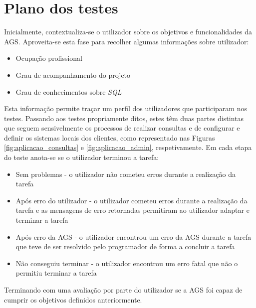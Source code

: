 \documentclass[11pt,twoside,a4paper]{report}
\begin{document}
\section{Plano dos testes}
Inicialmente, contextualiza-se o utilizador sobre os objetivos e funcionalidades da AGS. Aproveita-se esta fase para recolher algumas informações sobre utilizador:
\begin{itemize}
	\item Ocupação profissional
	\item Grau de acompanhamento do projeto
	\item Grau de conhecimentos sobre \textit{SQL}
\end{itemize}
Esta informação permite traçar um perfil dos utilizadores que participaram nos testes. Passando aos testes propriamente ditos, estes têm duas partes distintas que seguem sensivelmente os processos de realizar consultas e de configurar e definir os sistemas locais dos clientes, como representado nas Figuras \ref{fig:aplicacao_consultas} e \ref{fig:aplicacao_admin}, respetivamente.
Em cada etapa do teste anota-se se o utilizador terminou a tarefa:
\begin{itemize}
	\item Sem problemas - o utilizador não cometeu erros durante a realização da tarefa
	\item Após erro do utilizador - o utilizador cometeu erros durante a realização da tarefa e as mensagens de erro retornadas permitiram ao utilizador adaptar e terminar a tarefa
	\item Após erro da AGS - o utilizador encontrou um erro da AGS durante a tarefa que teve de ser resolvido pelo programador de forma a concluir a tarefa
	\item Não conseguiu terminar - o utilizador encontrou um erro fatal que não o permitiu terminar a tarefa
\end{itemize}
Terminando com uma avaliação por parte do utilizador se a AGS foi capaz de cumprir os objetivos definidos anteriormente.
\end{document}
